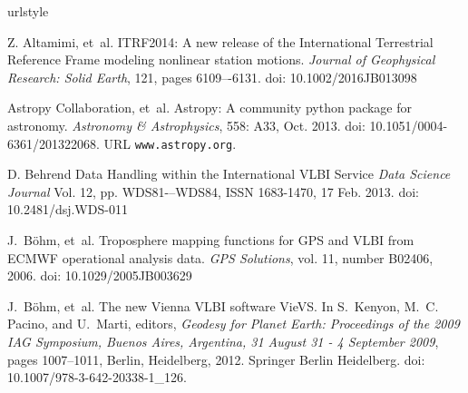 \documentclass[natbib,twocolumn,twoside]{svmultiag}
\begin{document}
\begin{thebibliography}{10}
\providecommand{\natexlab}[1]{#1}
\providecommand{\url}[1]{\texttt{#1}}
\expandafter\ifx\csname urlstyle\endcsname\relax
  \providecommand{\doi}[1]{doi: #1}\else
  \providecommand{\doi}{doi: \begingroup \urlstyle{rm}\Url}\fi

Z. Altamimi, et~al.
\newblock ITRF2014: A new release of the International Terrestrial Reference Frame modeling nonlinear station motions.
\newblock \emph{Journal of Geophysical Research: Solid Earth}, 121, pages 6109–-6131.
\newblock \doi{10.1002/2016JB013098}

{Astropy Collaboration}, et~al.
\newblock Astropy: A community python package for astronomy.
\newblock \emph{Astronomy \& Astrophysics}, 558: A33, Oct. 2013.
\newblock \doi{10.1051/0004-6361/201322068}.
\newblock URL \url{www.astropy.org}.

D. Behrend
\newblock Data Handling within the International VLBI Service
\newblock \emph{Data Science Journal} Vol. 12, pp. WDS81-–WDS84, ISSN 1683-1470, 17 Feb. 2013.
\newblock \doi{10.2481/dsj.WDS-011}

J.~B\"ohm, et~al.
\newblock Troposphere mapping functions for GPS and VLBI from ECMWF operational analysis data.
\newblock \emph{GPS Solutions}, vol. 11, number B02406, 2006.
\newblock \doi{10.1029/2005JB003629}

J.~B\"ohm, et~al.
\newblock The new {V}ienna {VLBI} software {VieVS}.
\newblock In S.~Kenyon, M.~C. Pacino, and U.~Marti, editors, \emph{Geodesy for
  Planet Earth: Proceedings of the 2009 IAG Symposium, Buenos Aires, Argentina,
  31 August 31 - 4 September 2009}, pages 1007--1011, Berlin, Heidelberg, 2012.
  Springer Berlin Heidelberg.
\newblock \doi{10.1007/978-3-642-20338-1\_126}.


\end{thebibliography}
\end{document}
